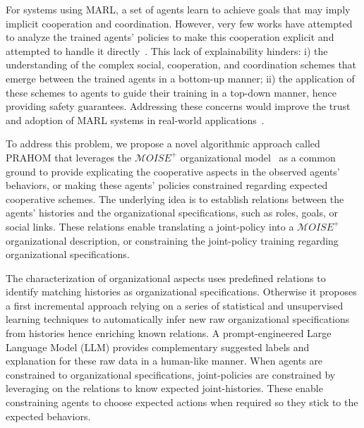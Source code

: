 \documentclass{ecai}
\newcounter{relation}
\begin{document}
For systems using MARL, a set of agents learn to achieve goals that may imply implicit cooperation and coordination. However, very few works have attempted to analyze the trained agents' policies to make this cooperation explicit and attempted to handle it directly~\citep{albrecht2018survey,perolat2017pool}. This lack of explainability hinders: \quad i) the understanding of the complex social, cooperation, and coordination schemes that emerge between the trained agents in a bottom-up manner; \quad ii) the application of these schemes to agents to guide their training in a top-down manner, hence providing safety guarantees.
Addressing these concerns would improve the trust and adoption of MARL systems in real-world applications~\citep{kok2006collaborative,omidshafiei2019learning}.


To address this problem, we propose a novel algorithmic approach called PRAHOM that leverages the $\mathcal{M}OISE^+$ organizational model~\citep{hubner2007moise} as a common ground to provide explicating the cooperative aspects in the observed agents' behaviors, or making these agents' policies constrained regarding expected cooperative schemes. The underlying idea is to establish relations between the agents' histories and the organizational specifications, such as roles, goals, or social links. These relations enable translating a joint-policy into a $\mathcal{M}OISE^+$ organizational description, or constraining the joint-policy training regarding organizational specifications.

The characterization of organizational aspects uses predefined relations to identify matching histories as organizational specifications. Otherwise it proposes a first incremental approach relying on a series of statistical and unsupervised learning techniques to automatically infer new raw organizational specifications from histories hence enriching known relations. A prompt-engineered Large Language Model (LLM) provides complementary suggested labels and explanation for these raw data in a human-like manner.
When agents are constrained to organizational specifications, joint-policies are constrained by leveraging on the relations to know expected joint-histories. These enable constraining agents to choose expected actions when required so they stick to the expected behaviors.
\end{document}
